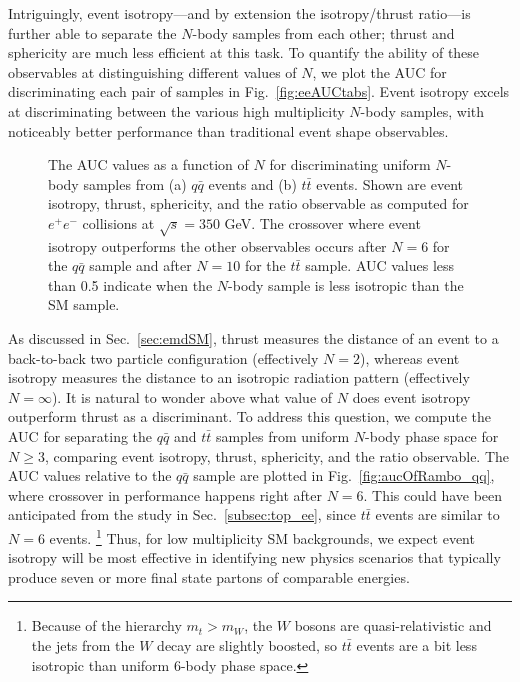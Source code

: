 \documentclass[letterpaper,11pt]{article}
\DeclareRobustCommand{\Sec}[1]{Sec.~\ref{#1}}
\DeclareRobustCommand{\Fig}[1]{Fig.~\ref{#1}}
\begin{document}
Intriguingly, event isotropy---and by extension the isotropy/thrust ratio---is further able to separate the $N$-body samples from each other; thrust and sphericity are much less efficient at this task. 
%
To quantify the ability of these observables at distinguishing different values of $N$, we plot the AUC for discriminating each pair of samples in \Fig{fig:eeAUCtabs}. 
%
Event isotropy excels at discriminating between the various high multiplicity $N$-body samples, with noticeably better performance than traditional event shape observables. 


\begin{figure}[t!]
%
\centering
\hfill
%
\caption{The AUC values as a function of $N$ for discriminating uniform $N$-body samples from (a) $q\bar{q}$ events and (b) $t\bar{t}$ events.
%
Shown are event isotropy, thrust, sphericity, and the ratio observable as computed for $e^+e^-$ collisions at $\sqrt{s} = 350$ GeV.
%
The crossover where event isotropy outperforms the other observables occurs after $N=6$ for the $q\bar{q}$ sample and after $N=10$ for the $t\bar{t}$ sample.
%
AUC values less than 0.5 indicate when the $N$-body sample is less isotropic than the SM sample.
}
%
\label{fig:aucOfRambo}
\end{figure}


As discussed in \Sec{sec:emdSM}, thrust measures the distance of an event to a back-to-back two particle configuration (effectively $N = 2$), whereas event isotropy measures the distance to an isotropic radiation pattern (effectively $N = \infty$). 
%
It is natural to wonder above what value of $N$ does event isotropy outperform thrust as a discriminant.
%
To address this question, we compute the AUC for separating the $q\bar{q}$ and $t\bar{t}$ samples from uniform $N$-body phase space for $N \geq 3$, comparing event isotropy, thrust, sphericity, and the ratio observable.
%
The AUC values relative to the $q\bar{q}$ sample are plotted in \Fig{fig:aucOfRambo_qq}, where crossover in performance happens right after $N=6$.
%
This could have been anticipated from the study in \Sec{subsec:top_ee}, since $t \bar{t}$ events are similar to $N= 6$ events.%
%
\footnote{Because of the hierarchy $m_t > m_W$, the $W$ bosons are quasi-relativistic and the jets from the $W$ decay are slightly boosted, so $t \bar{t}$ events are a bit less isotropic than uniform 6-body phase space.}
%
Thus, for low multiplicity SM backgrounds, we expect event isotropy will be most effective in identifying new physics scenarios that typically produce seven or more final state partons of comparable energies.
\end{document}
